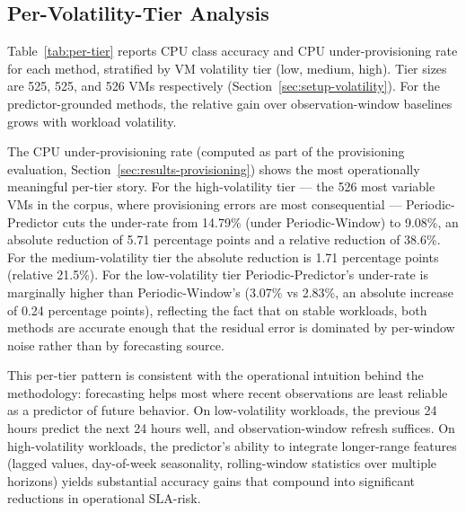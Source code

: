 \documentclass[manuscript,screen,review,anonymous]{acmart}
\begin{document}
\subsection{Per-Volatility-Tier Analysis}\label{sec:results-tier}

Table~\ref{tab:per-tier} reports CPU class accuracy and CPU
under-provisioning rate for each method, stratified by VM
volatility tier (low, medium, high). Tier sizes are 525, 525, and
526 VMs respectively (Section~\ref{sec:setup-volatility}). For
the predictor-grounded methods, the relative gain over
observation-window baselines grows with workload volatility.

\begin{table}
\centering
\caption{Per-volatility-tier results. CPU class accuracy and CPU
under-provisioning rate for each method, by tier. The
predictor-grounded methods' relative gains are largest in the
high-volatility tier.}
\label{tab:per-tier}

\end{table}

The CPU under-provisioning rate (computed as part of the
provisioning evaluation,
Section~\ref{sec:results-provisioning}) shows the most
operationally meaningful per-tier story. For the high-volatility
tier --- the 526 most variable VMs in the corpus, where
provisioning errors are most consequential ---
Periodic-Predictor cuts the under-rate from 14.79\% (under
Periodic-Window) to 9.08\%, an absolute reduction of 5.71
percentage points and a relative reduction of 38.6\%. For the
medium-volatility tier the absolute reduction is 1.71 percentage
points (relative 21.5\%). For the low-volatility tier
Periodic-Predictor's under-rate is marginally higher than
Periodic-Window's (3.07\% vs 2.83\%, an absolute increase of
0.24 percentage points), reflecting the fact that on stable
workloads, both methods are accurate enough that the residual
error is dominated by per-window noise rather than by
forecasting source.

This per-tier pattern is consistent with the operational
intuition behind the methodology: forecasting helps most where
recent observations are least reliable as a predictor of future
behavior. On low-volatility workloads, the previous 24 hours
predict the next 24 hours well, and observation-window refresh
suffices. On high-volatility workloads, the predictor's ability
to integrate longer-range features (lagged values, day-of-week
seasonality, rolling-window statistics over multiple horizons)
yields substantial accuracy gains that compound into significant
reductions in operational SLA-risk.
\end{document}
